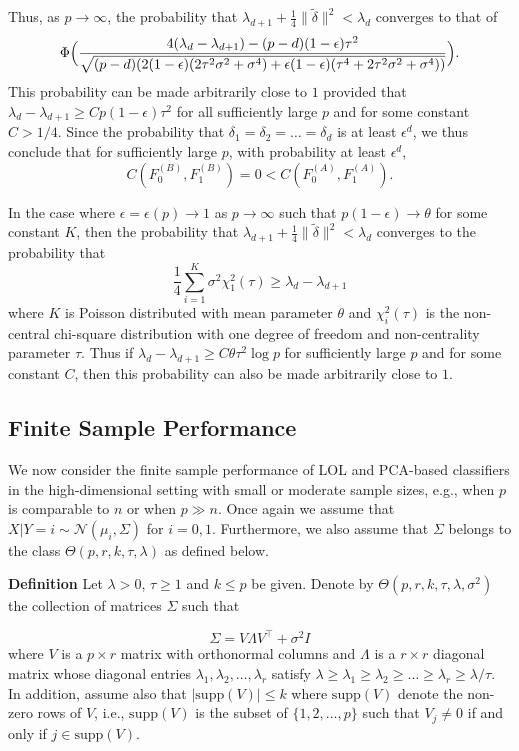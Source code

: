 \documentclass[10pt]{article}
\begin{document}
Thus, as $p \rightarrow \infty$, the probability that $\lambda_{d+1} + \tfrac{1}{4} \|\tilde{\delta}\|^{2} < \lambda_d$ converges to that of
$$\Phi\Bigl(\frac{4(\lambda_d - \lambda_{d+1}) - (p - d) (1 - \epsilon) \tau^2}{\sqrt{(p - d)(2 (1 - \epsilon) (2 \tau^2 \sigma^2 + \sigma^4) + \epsilon (1 - \epsilon) (\tau^4 + 2 \tau^2 \sigma^2 + \sigma^4))}} \Bigr).$$ This probability can be made arbitrarily close to $1$ provided that $\lambda_{d} - \lambda_{d+1} \geq Cp(1 - \epsilon) \tau^2$ for all sufficiently large $p$ and for some constant $C > 1/4$. Since the probability that $\delta_1 = \delta_2 = \dots = \delta_d$ is at least $\epsilon^{d}$, we thus conclude that for sufficiently large $p$, with probability at least $\epsilon^{d}$,
$$C(F_0^{(B)}, F_1^{(B)}) = 0 < C(F_0^{(A)}, F_1^{(A)}).$$

In the case where $\epsilon = \epsilon(p) \rightarrow 1$ as $p \rightarrow \infty$ such that $p(1 - \epsilon) \rightarrow \theta$ for some constant $K$, then the probability that $\lambda_{d+1} + \tfrac{1}{4} \|\tilde{\delta}\|^{2} < \lambda_d$ converges to the probability that
$$\frac{1}{4} \sum_{i=1}^{K} \sigma^2 \chi_{1}^{2}(\tau) \geq \lambda_{d} - \lambda_{d+1} $$
where $K$ is Poisson distributed with mean parameter $\theta$ and $\chi_{i}^{2}(\tau)$ is the non-central chi-square distribution with one degree of freedom and non-centrality parameter $\tau$. Thus if $\lambda_{d} - \lambda_{d+1} \geq C \theta \tau^2 \log{p}$ for sufficiently large $p$ and for some constant $C$, then this probability can also be made arbitrarily close to $1$.

\subsection{Finite Sample Performance}
We now consider the finite sample performance of LOL and PCA-based classifiers in the high-dimensional setting with small or moderate sample sizes, e.g., when $p$ is comparable to $n$ or when $p \gg n$. Once again we assume that $X | Y = i \sim \mathcal{N}(\mu_i, \Sigma)$ for $i = 0, 1$. Furthermore, we also assume that $\Sigma$ belongs to the class $\Theta(p,r,k,\tau,\lambda)$ as defined below.

{\bf Definition} Let $\lambda > 0$, $\tau \geq 1$ and $k \leq p$ be given. Denote by $\Theta(p,r,k,\tau,\lambda,\sigma^2)$ the collection of matrices $\Sigma$ such that

$$ \Sigma = V \Lambda V^{\top} + \sigma^2 I $$
where $V$ is a $p \times r$  matrix with orthonormal columns and $\Lambda$ is a $r \times r$ diagonal matrix whose diagonal entries $\lambda_1, \lambda_2, \dots, \lambda_r$ satisfy $\lambda \geq \lambda_1 \geq \lambda_2 \geq \dots \geq \lambda_r \geq \lambda/\tau$. In addition, assume also that $|\mathrm{supp}(V)| \leq k$ where $\mathrm{supp}(V)$ denote the non-zero rows of $V$, i.e., $\mathrm{supp}(V)$ is the subset of $\{1,2,\dots,p\}$ such that $V_j \not = 0$ if and only if $j \in \mathrm{supp}(V)$.
\end{document}
